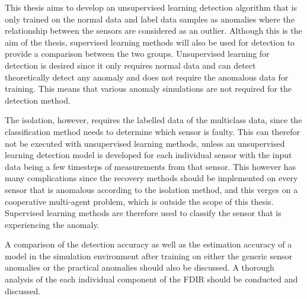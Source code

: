 This thesis aims to develop an unsupervised learning detection algorithm that is only trained on the normal data and label data samples as anomalies where the relationship between the sensors are considered as an outlier. Although this is the aim of the thesis, supervised learning methods will also be used for detection to provide a comparison between the two groups. Unsupervised learning for detection is desired since it only requires normal data and can detect theoretically detect any anomaly and does not require the anomalous data for training. This means that various anomaly simulations are not required for the detection method.

The isolation, however, requires the labelled data of the multiclass data, since the classification method needs to determine which sensor is faulty. This can therefor not be executed with unsupervised learning methods, unless an unsupervised learning detection model is developed for each individual sensor with the input data being a few timesteps of measurements from that sensor. This however has many complications since the recovery methods should be implemented on every sensor that is anomalous according to the isolation method, and this verges on a cooperative multi-agent problem, which is outside the scope of this thesis. Supervised learning methods are therefore used to classify the sensor that is experiencing the anomaly.

A comparison of the detection accuracy as well as the estimation accuracy of a model in the simulation environment after training on either the generic sensor anomalies or the practical anomalies should also be discussed. A thorough analysis of the each individual component of the FDIR should be conducted and discussed. 

%

